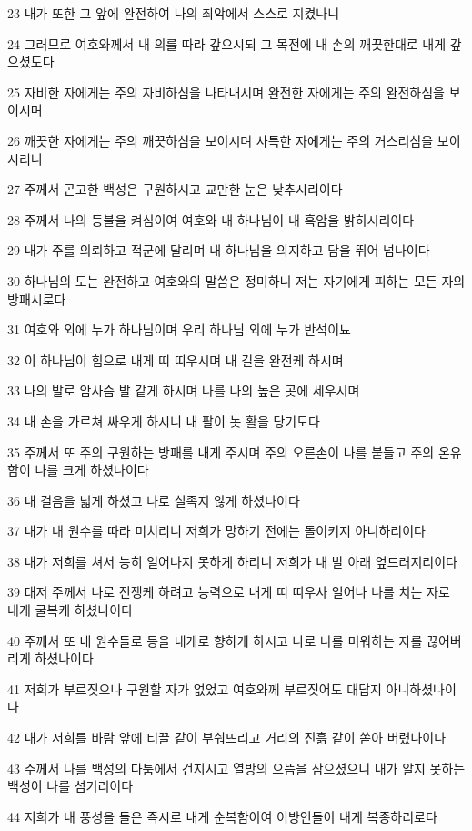 \par 23 내가 또한 그 앞에 완전하여 나의 죄악에서 스스로 지켰나니
\par 24 그러므로 여호와께서 내 의를 따라 갚으시되 그 목전에 내 손의 깨끗한대로 내게 갚으셨도다
\par 25 자비한 자에게는 주의 자비하심을 나타내시며 완전한 자에게는 주의 완전하심을 보이시며
\par 26 깨끗한 자에게는 주의 깨끗하심을 보이시며 사특한 자에게는 주의 거스리심을 보이시리니
\par 27 주께서 곤고한 백성은 구원하시고 교만한 눈은 낮추시리이다
\par 28 주께서 나의 등불을 켜심이여 여호와 내 하나님이 내 흑암을 밝히시리이다
\par 29 내가 주를 의뢰하고 적군에 달리며 내 하나님을 의지하고 담을 뛰어 넘나이다
\par 30 하나님의 도는 완전하고 여호와의 말씀은 정미하니 저는 자기에게 피하는 모든 자의 방패시로다
\par 31 여호와 외에 누가 하나님이며 우리 하나님 외에 누가 반석이뇨
\par 32 이 하나님이 힘으로 내게 띠 띠우시며 내 길을 완전케 하시며
\par 33 나의 발로 암사슴 발 같게 하시며 나를 나의 높은 곳에 세우시며
\par 34 내 손을 가르쳐 싸우게 하시니 내 팔이 놋 활을 당기도다
\par 35 주께서 또 주의 구원하는 방패를 내게 주시며 주의 오른손이 나를 붙들고 주의 온유함이 나를 크게 하셨나이다
\par 36 내 걸음을 넓게 하셨고 나로 실족지 않게 하셨나이다
\par 37 내가 내 원수를 따라 미치리니 저희가 망하기 전에는 돌이키지 아니하리이다
\par 38 내가 저희를 쳐서 능히 일어나지 못하게 하리니 저희가 내 발 아래 엎드러지리이다
\par 39 대저 주께서 나로 전쟁케 하려고 능력으로 내게 띠 띠우사 일어나 나를 치는 자로 내게 굴복케 하셨나이다
\par 40 주께서 또 내 원수들로 등을 내게로 향하게 하시고 나로 나를 미워하는 자를 끊어버리게 하셨나이다
\par 41 저희가 부르짖으나 구원할 자가 없었고 여호와께 부르짖어도 대답지 아니하셨나이다
\par 42 내가 저희를 바람 앞에 티끌 같이 부숴뜨리고 거리의 진흙 같이 쏟아 버렸나이다
\par 43 주께서 나를 백성의 다툼에서 건지시고 열방의 으뜸을 삼으셨으니 내가 알지 못하는 백성이 나를 섬기리이다
\par 44 저희가 내 풍성을 들은 즉시로 내게 순복함이여 이방인들이 내게 복종하리로다

